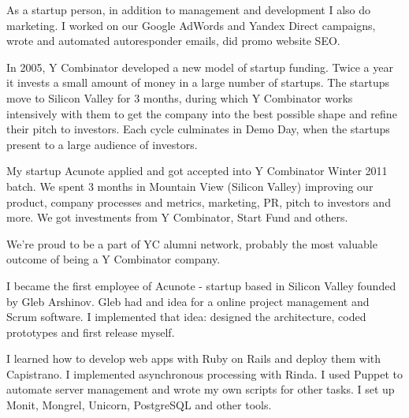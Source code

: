 \documentclass[12pt]{letter}
\begin{document}
\begin{llist}
           \item As a startup person, in addition to management and development I also do marketing. I worked on our Google AdWords and Yandex Direct campaigns, wrote and automated autoresponder emails, did promo website SEO.

  \endexperience


  \startexperience

           \item In 2005, Y Combinator developed a new model of startup funding. Twice a year it invests a small amount of money in a large number of startups. The startups move to Silicon Valley for 3 months, during which Y Combinator works intensively with them to get the company into the best possible shape and refine their pitch to investors. Each cycle culminates in Demo Day, when the startups present to a large audience of investors. 

           \item My startup Acunote applied and got accepted into Y Combinator Winter 2011 batch. We spent 3 months in Mountain View (Silicon Valley) improving our product, company processes and metrics, marketing, PR, pitch to investors and more. We got investments from Y Combinator, Start Fund and others.

           \item We're proud to be a part of YC alumni network, probably the most valuable outcome of being a Y Combinator company.

  \endexperience


  \startexperience

           \item I became the first employee of Acunote - startup based in Silicon Valley founded by Gleb Arshinov. Gleb had and idea for a online project management and Scrum software. I implemented that idea: designed the architecture, coded prototypes and first release myself.

           \item I learned how to develop web apps with Ruby on Rails and deploy them with Capistrano. I implemented asynchronous processing with Rinda. I used Puppet to automate server management and wrote my own scripts for other tasks. I set up Monit, Mongrel, Unicorn, PostgreSQL and other tools.


\end{llist}
\end{document}
